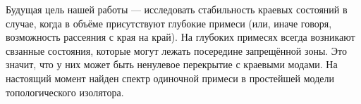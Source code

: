     Будущая цель нашей работы --- исследовать стабильность краевых состояний 
    в случае, когда в объёме присутствуют глубокие примеси (или, 
    иначе говоря, возможность рассеяния с края на край). На глубоких примесях всегда
    возникают свзанные состояния, которые могут лежать посередине запрещённой зоны. Это
    значит, что у них может быть ненулевое перекрытие с краевыми модами. На настоящий 
    момент найден спектр одиночной примеси в простейшей модели топологического изолятора.

    


    
